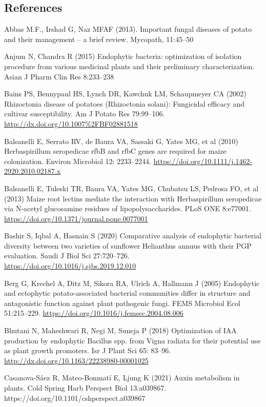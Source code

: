 \documentclass[sn-mathphys,Numbered]{sn-jnl}%
\theoremstyle{thmstyleone}%
\theoremstyle{thmstyletwo}%
\theoremstyle{thmstylethree}%
\begin{document}
\subsection*{References}
Abbas M.F., Irshad G, Naz MFAF (2013). Important fungal diseases of potato and their management – a brief review. Mycopath, 11:45–50 

Anjum N, Chandra R (2015) Endophytic bacteria: optimization of isolation procedure from various medicinal plants and their preliminary characterization. Asian J Pharm Clin Res 8:233–238

Bains PS, Bennypaul HS, Lynch DR, Kawchuk LM, Schaupmeyer CA (2002) Rhizoctonia disease of potatoes (Rhizoctonia solani): Fungicidal efficacy and cultivar susceptibility. Am J Potato Res 79:99–106. \url{http://dx.doi.org/10.1007%2FBF02881518    }

Balsanelli E, Serrato RV, de Baura VA, Sassaki G, Yates MG, et al (2010) Herbaspirillum seropedicae rfbB and rfbC genes are required for maize colonization. Environ Microbiol 12: 2233–2244. \url{https://doi.org/10.1111/j.1462-2920.2010.02187.x}

Balsanelli E, Tuleski TR, Baura VA, Yates MG, Chubatsu LS, Pedrosa FO, et al (2013) Maize root lectins mediate the interaction with Herbaspirillum seropedicae via N-acetyl glucosamine residues of lipopolysaccharides. PLoS ONE 8:e77001. \url{https://doi.org/10.1371/journal.pone.0077001}

Bashir S, Iqbal A, Hasnain S (2020) Comparative analysis of endophytic bacterial diversity between two varieties of sunflower Helianthus annuus with their PGP evaluation. Saudi J Biol Sci 27:720–726.  \url{https://doi.org/10.1016/j.sjbs.2019.12.010}

Berg G, Krechel A, Ditz M, Sikora RA, Ulrich A, Hallmann J (2005) Endophytic and ectophytic potato-associated bacterial communities differ in structure and antagonistic function against plant pathogenic fungi. FEMS Microbiol Ecol 51:215–229. \url{https://doi.org/10.1016/j.femsec.2004.08.006}

Bhutani N, Maheshwari R, Negi M, Suneja P (2018) Optimization of IAA production by endophytic Bacillus spp. from Vigna radiata for their potential use as plant growth promoters. Isr J Plant Sci 65: 83–96. \url{http://dx.doi.org/10.1163/22238980-00001025}

Casanova-Sáez R, Mateo-Bonmatí E, Ljung K (2021) Auxin metabolism in plants. Cold Spring Harb Perspect Biol 13:a039867. https://doi.org/10.1101/cshperspect.a039867
\end{document}
